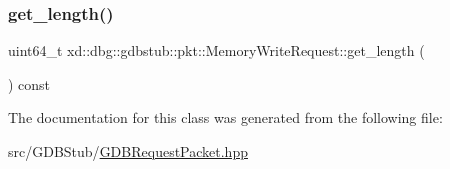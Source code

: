 \mbox{\label{classxd_1_1dbg_1_1gdbstub_1_1pkt_1_1_memory_write_request_a3e84e4c5ff530aa9f869ec388e08445e}} 
\subsubsection{\texorpdfstring{get\+\_\+length()}{get\_length()}}
{\footnotesize\ttfamily uint64\+\_\+t xd\+::dbg\+::gdbstub\+::pkt\+::\+Memory\+Write\+Request\+::get\+\_\+length (\begin{DoxyParamCaption}{ }\end{DoxyParamCaption}) const\hspace{0.3cm}{\ttfamily [inline]}}



The documentation for this class was generated from the following file\+:\begin{DoxyCompactItemize}
\item 
src/\+G\+D\+B\+Stub/\mbox{\hyperlink{_g_d_b_request_packet_8hpp}{G\+D\+B\+Request\+Packet.\+hpp}}\end{DoxyCompactItemize}
